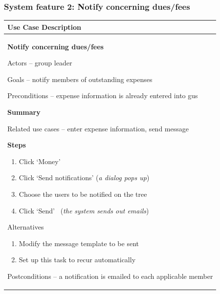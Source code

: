 \documentclass[letterpaper]{article}
\newcommand\textstyleDefaultParagraphFont[1]{#1}
\newcommand\liststyleLiii{%
\renewcommand\theenumi{\arabic{enumi}}
\renewcommand\theenumii{\alph{enumii}}
\renewcommand\theenumiii{\roman{enumiii}}
\renewcommand\theenumiv{\arabic{enumiv}}
\renewcommand\labelenumi{\theenumi.}
\renewcommand\labelenumii{\theenumii.}
\renewcommand\labelenumiii{\theenumiii.}
\renewcommand\labelenumiv{\theenumiv.}
}
\newcommand\liststyleLiv{%
\renewcommand\theenumi{\arabic{enumi}}
\renewcommand\theenumii{\alph{enumii}}
\renewcommand\theenumiii{\roman{enumiii}}
\renewcommand\theenumiv{\arabic{enumiv}}
\renewcommand\labelenumi{\theenumi.}
\renewcommand\labelenumii{\theenumii.}
\renewcommand\labelenumiii{\theenumiii.}
\renewcommand\labelenumiv{\theenumiv.}
}
\begin{document}
\bigskip

\subsubsection[System feature 2: Notify concerning dues/fees]{\rmfamily
System feature 2: Notify concerning dues/fees}
\begin{flushleft}
\tablehead{}
\begin{supertabular}{|m{6.42126in}|}
\hline
\bfseries\color{black} Use Case Description\\\hline
{\bfseries\color{black} Notify concerning dues/fees}

{\color{black} Actors -- group leader}

{\color{black} Goals -- notify members of outstanding expenses}

{\color{black} Preconditions -- expense information is already entered
into gus}

{\bfseries\color{black} Summary}

{\color{black} Related use cases -- enter expense information, send
message}

{\bfseries\color{black} Steps}

\liststyleLiii
\begin{enumerate}
\item \color{black} Click {\textquoteleft}Money{\textquoteright}\item
\color{black} Click {\textquoteleft}Send notifications{\textquoteright}
(\textstyleDefaultParagraphFont{\textit{a dialog pops up}})\item
\color{black} Choose the users to be notified on the tree\item
\color{black} Click {\textquoteleft}Send{\textquoteright}
\ (\textstyleDefaultParagraphFont{\textit{the system sends out
emails}})\end{enumerate}
{\color{black} Alternatives}

\liststyleLiv
\begin{enumerate}
\item \color{black} Modify the message template to be sent\item
\color{black} Set up this task to recur automatically\end{enumerate}
\color{black} Postconditions -- a notification is emailed to each
applicable member\\\hline
\end{supertabular}
\end{flushleft}
\end{document}
